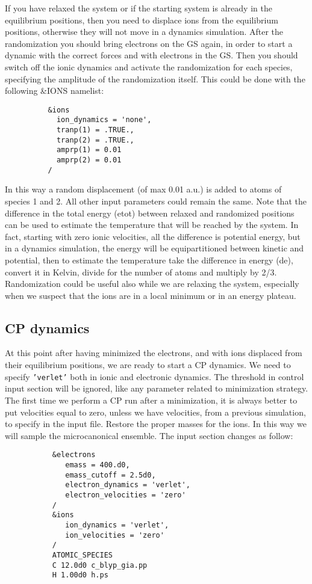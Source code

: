 \documentclass[12pt,a4paper]{article}
\begin{document}
If you have relaxed the system or if the starting system is already in
the equilibrium positions, then you need to displace ions from the equilibrium 
positions, otherwise they will not move in a dynamics simulation.
After the randomization you should bring electrons on the GS again,
in order to start a dynamic with the correct forces and with electrons 
in the GS. Then you should switch off the ionic dynamics and activate 
the randomization for each species, specifying the amplitude of the 
randomization itself. This could be done with the following 
\&IONS namelist:
\begin{verbatim}
          &ions
            ion_dynamics = 'none',
            tranp(1) = .TRUE.,
            tranp(2) = .TRUE.,
            amprp(1) = 0.01
            amprp(2) = 0.01
          /
\end{verbatim}
In this way a random displacement (of max 0.01 a.u.) is added to atoms of 
species 1 and 2. All other input parameters could remain the same.
Note that the difference in the total energy (etot) between relaxed and
randomized positions can be used to estimate the temperature that will
be reached by the system. In fact, starting with zero ionic velocities,
all the difference is potential energy, but in a dynamics simulation, the
energy will be equipartitioned between kinetic and potential, then to
estimate the temperature take the difference in energy (de), convert it
in Kelvin, divide for the number of atoms and multiply by 2/3.
Randomization could be useful also while we are relaxing the system,
especially when we suspect that the ions are in a local minimum or in
an energy plateau.

\subsection{CP dynamics}

At this point after having minimized the electrons, and with ions displaced from their equilibrium positions, we are ready to start a CP
dynamics. We need to specify \texttt{'verlet'} both in ionic and electronic
dynamics. The threshold in control input section will be ignored, like
any parameter related to minimization strategy. The first time we perform 
a CP run after a minimization, it is always better to put velocities equal
to zero, unless we have velocities, from a previous simulation, to
specify in the input file. Restore the proper masses for the ions. In this
way we will sample the microcanonical ensemble. The input section
changes as follow:
\begin{verbatim}
           &electrons
              emass = 400.d0,
              emass_cutoff = 2.5d0,
              electron_dynamics = 'verlet',
              electron_velocities = 'zero'
           /
           &ions
              ion_dynamics = 'verlet',
              ion_velocities = 'zero'
           /
           ATOMIC_SPECIES
           C 12.0d0 c_blyp_gia.pp
           H 1.00d0 h.ps
\end{verbatim}
\end{document}

